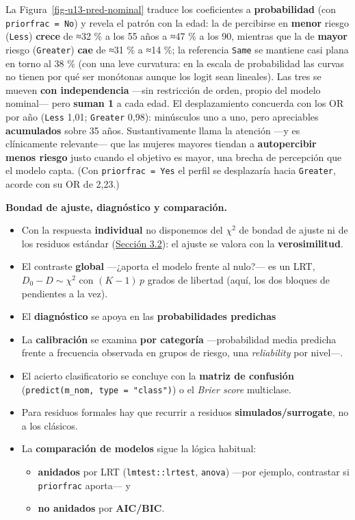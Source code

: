\documentclass[
  letterpaper,
  DIV=11,
  numbers=noendperiod]{scrartcl}
\providecommand{\tightlist}{%
  \setlength{\itemsep}{0pt}\setlength{\parskip}{0pt}}\usepackage{longtable,booktabs,array}
\begin{document}
La Figura~\ref{fig-u13-pred-nominal} traduce los coeficientes a
\textbf{probabilidad} (con \texttt{priorfrac\ =\ No}) y revela el patrón
con la edad: la de percibirse en \textbf{menor} riesgo (\texttt{Less})
\textbf{crece} de ≈32 \% a los 55 años a ≈47 \% a los 90, mientras que
la de \textbf{mayor} riesgo (\texttt{Greater}) \textbf{cae} de ≈31 \% a
≈14 \%; la referencia \texttt{Same} se mantiene casi plana en torno al
38 \% (con una leve curvatura: en la escala de probabilidad las curvas
no tienen por qué ser monótonas aunque los logit sean lineales). Las
tres se mueven \textbf{con independencia} ---sin restricción de orden,
propio del modelo nominal--- pero \textbf{suman 1} a cada edad. El
desplazamiento concuerda con los OR por año (\texttt{Less} 1,01;
\texttt{Greater} 0,98): minúsculos uno a uno, pero apreciables
\textbf{acumulados} sobre 35 años. Sustantivamente llama la atención
---y es clínicamente relevante--- que las mujeres mayores tiendan a
\textbf{autopercibir menos riesgo} justo cuando el objetivo es mayor,
una brecha de percepción que el modelo capta. (Con
\texttt{priorfrac\ =\ Yes} el perfil se desplazaría hacia
\texttt{Greater}, acorde con su OR de 2,23.)

\textbf{Bondad de ajuste, diagnóstico y comparación.}

\begin{itemize}
\tightlist
\item
  Con la respuesta \textbf{individual} no disponemos del \(\chi^2\) de
  bondad de ajuste ni de los residuos estándar
  (\protect\hyperlink{sec-u13-gof-binomial}{Sección 3.2}): el ajuste se
  valora con la \textbf{verosimilitud}.
\item
  El contraste \textbf{global} ---¿aporta el modelo frente al nulo?---
  es un LRT, \(D_0-D\sim\chi^2\) con \((K-1)\,p\) grados de libertad
  (aquí, los dos bloques de pendientes a la vez).
\item
  El \textbf{diagnóstico} se apoya en las \textbf{probabilidades
  predichas}
\item
  La \textbf{calibración} se examina \textbf{por categoría}
  ---probabilidad media predicha frente a frecuencia observada en grupos
  de riesgo, una \emph{reliability} por nivel---.
\item
  El acierto clasificatorio se concluye con la \textbf{matriz de
  confusión} (\texttt{predict(m\_nom,\ type\ =\ "class")}) o el
  \emph{Brier score} multiclase.
\item
  Para residuos formales hay que recurrir a residuos
  \textbf{simulados/surrogate}, no a los clásicos.
\item
  La \textbf{comparación de modelos} sigue la lógica habitual:

  \begin{itemize}
  \tightlist
  \item
    \textbf{anidados} por LRT (\texttt{lmtest::lrtest}, \texttt{anova})
    ---por ejemplo, contrastar si \texttt{priorfrac} aporta--- y
  \item
    \textbf{no anidados} por \textbf{AIC/BIC}.
  \end{itemize}
\end{itemize}
\end{document}

